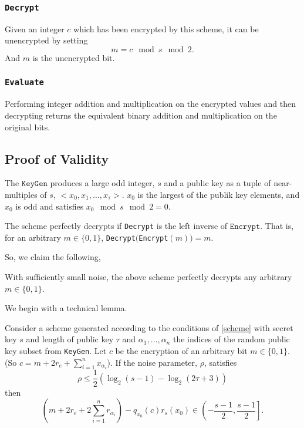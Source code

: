 \documentclass[a4paper,11pt, oneside]{article}
\begin{document}
\subsubsection{\texttt{Decrypt}}
Given an integer $c$ which has been encrypted by this scheme, it can be unencrypted by setting
\[m = c\mod{s}\mod{2}.\]
And $m$ is the unencrypted bit.

\subsubsection{\texttt{Evaluate}}
Performing integer addition and multiplication on the encrypted values and then decrypting returns the equivalent binary addition and multiplication on the original bits.

\subsection{Proof of Validity}\label{sec:proof}
The $\texttt{KeyGen}$ produces a large odd integer, $s$ and a public key as a tuple of near-multiples of $s$, $<x_0,x_1,\dots,x_\tau>$.  $x_0$ is the largest of the publik key elements, and $x_0$ is odd and satisfies $x_0\mod{s}\mod{2} = 0$.


The scheme perfectly decrypts if \texttt{Decrypt} is the left inverse of $\texttt{Encrypt}$.  That is, for an arbitrary $m\in\{0,1\}$, \texttt{Decrypt}$($\texttt{Encrypt}$(m)) = m$.

So, we claim the following,
\begin{theorem}
    With sufficiently small noise, the above scheme perfectly decrypts any arbitrary $m\in\{0,1\}$.
    \label{perfect}
\end{theorem}

We begin with a technical lemma.
\begin{lemma}
    Consider a scheme generated according to the conditions of \ref{scheme} with secret key $s$ and length of public key $\tau$ and $\alpha_1,\dots,\alpha_n$ the indices of the random public key subset from \texttt{KeyGen}.  Let $c$ be the encryption of an arbitrary bit $m\in\{0,1\}$. (So $c = m + 2r_e + \sum_{i=1}^n x_{\alpha_i}$).
    If the noise parameter, $\rho$, satisfies 
    \[\rho \leq \frac{1}{2}\left( \log_2(s-1) - \log_2(2\tau+3)\right)\]
    then 
    \[
        \left(m + 2r_e + 2\sum_{i=1}^n r_{\alpha_i}\right) - q_{x_0}(c)r_s(x_0) \in \left(-\frac{s-1}{2}, \frac{s-1}{2}\right].\]
    \label{bound}
\end{lemma}
\end{document}
